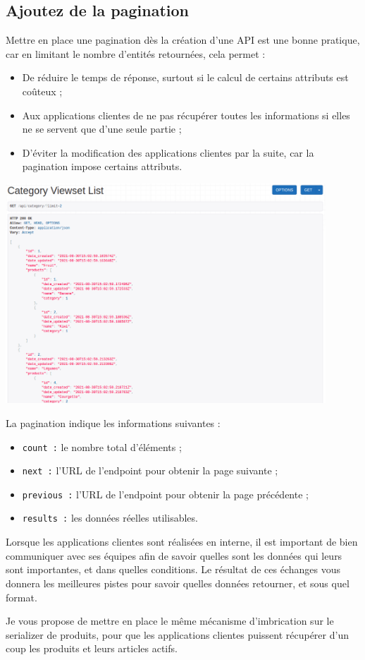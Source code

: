 \documentclass[a4paper]{article}
\begin{document}
\subsection{Ajoutez de la pagination}
Mettre en place une pagination dès la création d’une API est une bonne pratique, car en limitant le nombre d’entités retournées, cela permet :
\begin{itemize}
\item De réduire le temps de réponse, surtout si le calcul de certains attributs est coûteux ;
\item Aux applications clientes de ne pas récupérer toutes les informations si elles ne se servent que d’une seule partie ;
\item D’éviter la modification des applications clientes par la suite, car la pagination impose certains attributs.
\end{itemize}
\begin{center}
\includegraphics[width=12cm]{images/image14.png}
\end{center}
La pagination indique les informations suivantes :
\begin{itemize}
\item {\tt count  :} le nombre total d’éléments ;
\item {\tt next  :} l’URL de l’endpoint pour obtenir la page suivante ;
\item {\tt previous  :} l’URL de l’endpoint pour obtenir la page précédente ;
\item {\tt results  :} les données réelles utilisables.
\end{itemize}
\begin{theorem}
Lorsque les applications clientes sont réalisées en interne, il est important de bien communiquer avec ses équipes afin de savoir quelles sont les données qui leurs sont importantes, et dans quelles conditions. Le résultat de ces échanges vous donnera les meilleures pistes pour savoir quelles données retourner, et sous quel format.
\end{theorem}
Je vous propose de mettre en place le même mécanisme d’imbrication sur le serializer de produits, pour que les applications clientes puissent récupérer d’un coup les produits et leurs articles actifs.
\end{document}
